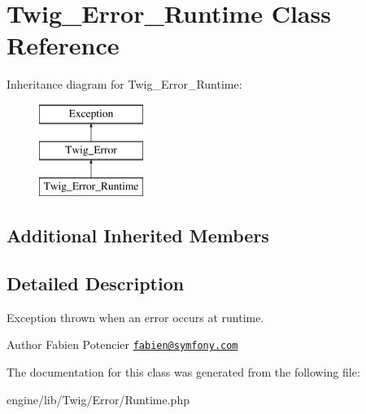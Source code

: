 \hypertarget{class_twig___error___runtime}{}\section{Twig\+\_\+\+Error\+\_\+\+Runtime Class Reference}
\label{class_twig___error___runtime}
Inheritance diagram for Twig\+\_\+\+Error\+\_\+\+Runtime\+:\begin{figure}[H]
\begin{center}
\leavevmode
\includegraphics[height=3.000000cm]{class_twig___error___runtime}
\end{center}
\end{figure}
\subsection*{Additional Inherited Members}


\subsection{Detailed Description}
Exception thrown when an error occurs at runtime.

\begin{DoxyAuthor}{Author}
Fabien Potencier \href{mailto:fabien@symfony.com}{\tt fabien@symfony.\+com} 
\end{DoxyAuthor}


The documentation for this class was generated from the following file\+:\begin{DoxyCompactItemize}
\item 
engine/lib/\+Twig/\+Error/Runtime.\+php\end{DoxyCompactItemize}
